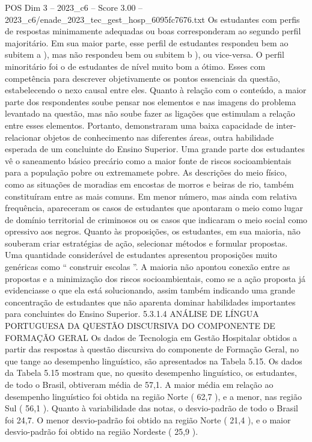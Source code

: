 \begin{textsample}{POS Dim 3 – 2023\_c6 – Score 3.00 – 2023\_c6/enade\_2023\_tec\_gest\_hosp\_6095fc7676.txt}
Os estudantes com perfis de respostas minimamente adequadas ou boas corresponderam ao segundo perfil majoritário.
Em sua maior parte, esse perfil de estudantes respondeu bem ao subitem a ), mas não respondeu bem ou subitem b ), ou vice-versa.
O perfil minoritário foi o de estudantes de nível muito bom a ótimo.
Esses com competência para descrever objetivamente os pontos essenciais da questão, estabelecendo o nexo causal entre eles.
Quanto à relação com o conteúdo, a maior parte dos respondentes soube pensar nos elementos e nas imagens do problema levantado na questão, mas não soube fazer as ligações que estimulam a relação entre esses elementos.
Portanto, demonstraram uma baixa capacidade de inter-relacionar objetos de conhecimento nas diferentes áreas, outra habilidade esperada de um concluinte do Ensino Superior.
Uma grande parte dos estudantes vê o saneamento básico precário como a maior fonte de riscos socioambientais para a população pobre ou extremamete pobre.
As descrições do meio físico, como as situações de moradias em encostas de morros e beiras de rio, também constituíram entre as mais comuns.
Em menor número, mas ainda com relativa frequência, apareceram os casos de estudantes que apontaram o meio como lugar de domínio territorial de criminosos ou os casos que indicaram o meio social como opressivo aos negros.
Quanto às proposições, os estudantes, em sua maioria, não souberam criar estratégias de ação, selecionar métodos e formular propostas.
Uma quantidade considerável de estudantes apresentou proposições muito genéricas como “ construir escolas ”.
A maioria não apontou conexão entre as propostas e a minimização dos riscos socioambientais, como se a ação proposta já evidenciasse o que ela está solucionando, assim também indicando uma grande concentração de estudantes que não aparenta dominar habilidades importantes para concluintes do Ensino Superior. 5.3.1.4 ANÁLISE DE LÍNGUA PORTUGUESA DA QUESTÃO DISCURSIVA DO COMPONENTE DE FORMAÇÃO GERAL Os dados de Tecnologia em Gestão Hospitalar obtidos a partir das respostas à questão discursiva do componente de Formação Geral, no que tange ao desempenho linguístico, são apresentados na Tabela 5.15.
Os dados da Tabela 5.15 mostram que, no quesito desempenho linguístico, os estudantes, de todo o Brasil, obtiveram média de 57,1.
A maior média em relação ao desempenho linguístico foi obtida na região Norte ( 62,7 ), e a menor, nas região Sul ( 56,1 ).
Quanto à variabilidade das notas, o desvio-padrão de todo o Brasil foi 24,7.
O menor desvio-padrão foi obtido na região Norte ( 21,4 ), e o maior desvio-padrão foi obtido na região Nordeste ( 25,9 ).

\end{textsample}
